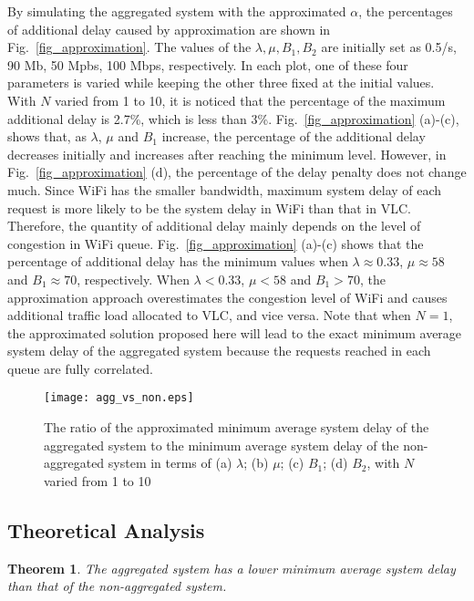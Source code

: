 \documentclass[10pt,journal]{IEEEtran}
\newtheorem{theorem}{Theorem}
\begin{document}
By simulating the aggregated system with the approximated $\alpha$, the percentages of additional delay caused by approximation are shown in Fig.~\ref{fig_approximation}. The values of the $\lambda, \mu, B_{1}, B_{2}$ are initially set as 0.5/s, 90 Mb, 50 Mpbs, 100 Mbps, respectively. In each plot, one of these four parameters is varied while keeping the other three fixed at the initial values. With $N$ varied from 1 to 10, it is noticed that the percentage of the maximum additional delay is 2.7\%, which is less than 3\%. Fig.~\ref{fig_approximation} (a)-(c), shows that, as $\lambda$, $\mu$ and $B_{1}$ increase, the percentage of the additional delay decreases initially and increases after reaching the minimum level. However, in Fig.~\ref{fig_approximation} (d), the percentage of the delay penalty does not change much. Since WiFi has the smaller bandwidth, maximum system delay of each request is more likely to be the system delay in WiFi than that in VLC. Therefore, the quantity of additional delay mainly depends on the level of congestion in WiFi queue. Fig.~\ref{fig_approximation} (a)-(c) shows that the percentage of additional delay has the minimum values  when $\lambda\approx0.33$, $\mu\approx58$ and $B_{1}\approx70$, respectively. When $\lambda<0.33$, $\mu<58$ and $B_{1}>70$, the approximation approach overestimates the congestion level of WiFi and causes additional traffic load allocated to VLC, and vice versa. Note that when $N=1$, the approximated solution proposed here will lead to the exact minimum average system delay of the aggregated system because the requests reached in each queue are fully correlated.

\begin{figure*}
\centering
\texttt{[image: agg\_vs\_non.eps]}
\vspace{-10pt}
\caption{The ratio of the approximated minimum average system delay of the aggregated system to the minimum average system delay of the non-aggregated system in terms of (a) $\lambda$; (b) $\mu$; (c) $B_{1}$; (d) $B_{2}$, with $N$ varied from 1 to 10}
\label{fig_agg_vs_non}
\vspace{-8pt}
\end{figure*}

\subsection{Theoretical Analysis}
\begin{theorem}
The aggregated system has a lower minimum average system delay than that of the non-aggregated system.
\end{theorem}
\end{document}
